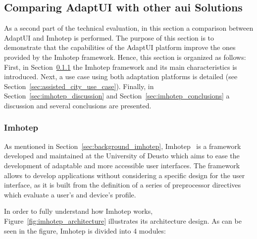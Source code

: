 \subsection{Comparing AdaptUI with other \ac{aui} Solutions}
\label{sec:imhotep_comparison}

As a second part of the technical evaluation, in this section a comparison 
between AdaptUI and Imhotep is performed. The purpose of this section is to 
demonstrate that the capabilities of the AdaptUI platform improve the ones 
provided by the Imhotep framework. Hence, this section is organized as follows: 
First, in Section~\ref{sec:imhotep_vs_adaptui} the Imhotep framework and its 
main characteristics is introduced. Next, a use case using both adaptation 
platforms is detailed (see Section~\ref{sec:assisted_city_use_case}). Finally, 
in Section~\ref{sec:imhotep_discussion} and Section~\ref{sec:imhotep_conclusions} 
a discussion and several conclusions are presented.

\subsubsection{Imhotep}
\label{sec:imhotep_vs_adaptui}

As mentioned in Section~\ref{sec:background_imhotep}, 
Imhotep~\citep{almeida_imhotep_2011} is a framework developed and maintained at
the University of Deusto which aims to ease the development of adaptable and 
more accessible user interfaces. The framework allows to develop applications 
without considering a specific design for the user interface, as it is built
from the definition of a series of preprocessor directives which evaluate a
user's and device's profile.

In order to fully understand how Imhotep works, Figure~\ref{fig:imhotep_architecture}
illustrates its architecture design. As can be seen in the figure, Imhotep is
divided into 4 modules:

